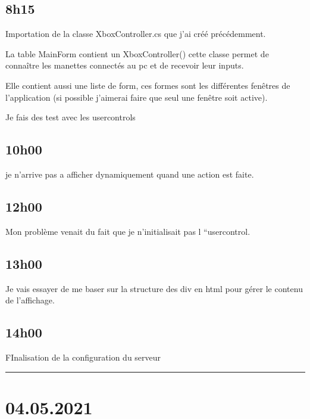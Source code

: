 \documentclass[a4paper,12pt,french]{sphinxmanual}
\begin{document}
\subsection{8h15}
\label{\detokenize{logbook:id61}}
\sphinxAtStartPar
Importation de la classe XboxController.cs que j’ai créé précédemment.

\sphinxAtStartPar
{}

\sphinxAtStartPar
La table MainForm contient un XboxController() cette classe permet de connaître les manettes connectés au pc et de recevoir leur inputs.

\sphinxAtStartPar
Elle contient aussi une liste de form, ces formes sont les différentes fenêtres de l’application (si possible j’aimerai faire que seul une fenêtre soit active).

\sphinxAtStartPar
Je fais des test avec les usercontrols


\subsection{10h00}
\label{\detokenize{logbook:id62}}
\sphinxAtStartPar
je n’arrive pas a afficher dynamiquement quand une action est faite.


\subsection{12h00}
\label{\detokenize{logbook:id63}}
\sphinxAtStartPar
Mon problème venait du fait que je n’initialisait pas l “usercontrol.


\subsection{13h00}
\label{\detokenize{logbook:id64}}
\sphinxAtStartPar
Je vais essayer de me baser sur la structure des div en html pour gérer le contenu de l’affichage.


\subsection{14h00}
\label{\detokenize{logbook:id65}}
\sphinxAtStartPar
FInalisation de la configuration du serveur


\bigskip\hrule\bigskip



\section{04.05.2021}
\label{\detokenize{logbook:id66}}
\end{document}
